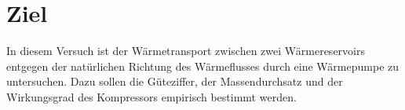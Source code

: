 \section{Ziel}
\label{sec:Ziel}
In diesem Versuch ist der Wärmetransport zwischen zwei Wärmereservoirs entgegen
der natürlichen Richtung des Wärmeflusses durch eine Wärmepumpe zu untersuchen.
Dazu sollen die Güteziffer, der Massendurchsatz und der Wirkungsgrad des Kompressors
empirisch bestimmt werden.
